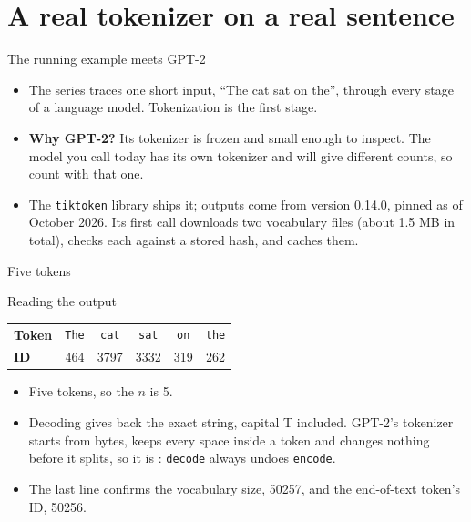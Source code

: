 \documentclass[aspectratio=169,11pt,t,\primeropts]{beamer}
\newcommand\tok[1]{\texttt{#1}}
\newcommand\vsp{\textvisiblespace}%
\begin{document}
\section{A real tokenizer on a real sentence}

\begin{frame}{The running example meets GPT-2}
  \begin{itemize}
    \item The series traces one short input, ``The cat sat on the'', through every stage of a
      language model. Tokenization is the first stage.
    \item \textbf{Why GPT-2?} Its tokenizer is frozen and small enough to inspect. The model you
      call today has its own tokenizer and will give different counts, so count with that one.
    \item The \texttt{tiktoken} library ships it; outputs come from version 0.14.0, pinned as of
      October 2026. Its first call downloads two vocabulary files (about 1.5 MB in total),
      checks each against a stored hash, and caches them.
  \end{itemize}
\end{frame}

\begin{frame}{Five tokens}
\end{frame}

\begin{frame}{Reading the output}
  \begin{center}\small
  \begin{tabular}{@{}lccccc@{}}
    \toprule
    \textbf{Token} & \tok{The} & \tok{\vsp cat} & \tok{\vsp sat} & \tok{\vsp on} & \tok{\vsp the}\\
    \textbf{ID} & 464 & 3797 & 3332 & 319 & 262\\
    \bottomrule
  \end{tabular}
  \end{center}
  \begin{itemize}
    \item Five tokens, so the  $n$ is 5.
    \item<2-> Decoding gives back the exact string, capital T included. GPT-2's tokenizer starts
      from bytes, keeps every space inside a token and changes nothing before it splits, so it is
      : \texttt{decode} always undoes \texttt{encode}.
    \item<3-> The last line confirms the vocabulary size, 50257, and the end-of-text token's ID,
      50256.
  \end{itemize}
\end{frame}
\end{document}
